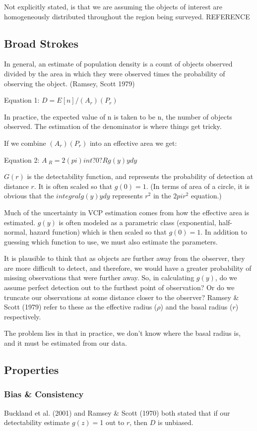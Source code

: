 \documentclass[12pt]{article}
\begin{document}
Not explicitly stated, is that we are assuming the objects of interest are homogeneously distributed throughout the region being surveyed. REFERENCE

\subsection{Broad Strokes}
In general, an estimate of population density is a count of objects observed divided by the area in which they were observed times the probability of observing the object. (Ramsey, Scott 1979)

Equation 1: $D = E[n]/(A_r)(P_r)$

In practice, the expected value of n is taken to be n, the number of objects observed. The estimation of the denominator is where things get tricky.

If we combine $(A_r)(P_r)$ into an effective area we get:

Equation 2: $A~_R = 2(pi) int?0?R g(y)ydy$

$G(r)$ is the detectability function, and represents the probability of detection at distance $r$. It is often scaled so that $g(0)=1$. (In terms of area of a circle, it is obvious that the $integral{g(y)ydy}$ represents $r^2$ in the $2pi r^2$ equation.)

Much of the uncertainty in VCP estimation comes from how the effective area is estimated. $g(y)$ is often modeled as a parametric class (exponential, half-normal, hazard function) which is then scaled so that $g(0)=1$. In addition to guessing which function to use, we must also estimate the parameters. 

It is plausible to think that as objects are further away from the observer, they are more difficult to detect, and therefore, we would have a greater probability of missing observations that were further away. So, in calculating $g(y)$, do we assume perfect detection out to the furthest point of observation? Or do we truncate our observations at some distance closer to the observer? Ramsey \& Scott (1979) refer to these as the effective radius ($\rho$) and the basal radius ($r$) respectively. 

The problem lies in that in practice, we don't know where the basal radius is, and it must be estimated from our data.

\subsection{Properties}
\subsubsection{Bias \& Consistency}
Buckland et al. (2001) and Ramsey \& Scott (1970) both stated that if our detectability estimate $g(z)=$1 out to $r$, then $D$ is unbiased. 
\end{document}

